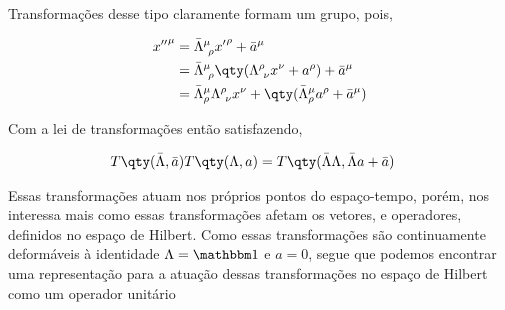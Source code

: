 \documentclass[twoside]{amsart}
\numberwithin{equation}{section}
\begin{document}
Transformações desse tipo claramente formam um grupo, pois,

\begin{align*}
    {x''}^\mu&={\bar\Lambda}^\mu_{\ \rho}{x'}^\rho+{\bar a}^\mu\\
    &={\bar\Lambda}^\mu_{\ \rho}\qty(\Lambda^\rho_{\ \nu}x^\nu+ a^\rho)+{\bar a}^\mu\\
    &={\bar\Lambda}^\mu_{\rho}\Lambda^\rho_{\ \nu}x^\nu+\qty({\bar\Lambda}^\mu_{\rho}a^\rho+{\bar a}^\mu)
\end{align*}

Com a lei de transformações então satisfazendo,

\begin{align*}
    T\qty(\bar\Lambda,\bar a)T\qty(\Lambda, a)&=T\qty(\bar\Lambda\Lambda,\bar\Lambda a+\bar a)
\end{align*}

Essas transformações atuam nos próprios pontos do espaço-tempo, porém, nos interessa mais como essas transformações 
afetam os vetores, e operadores, definidos no espaço de Hilbert. Como essas transformações são continuamente deformáveis 
à identidade $\Lambda=\mathbbm 1$ e $a=0$, segue que podemos encontrar uma representação para a atuação dessas transformações no espaço de Hilbert como um operador unitário 
\end{document}
